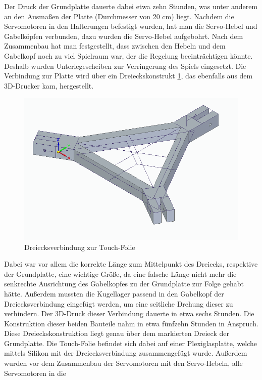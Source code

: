 \documentclass[12pt,a4paper,bibliography=totoc,listof=totoc]{scrartcl}
\begin{document}
Der Druck der Grundplatte dauerte dabei etwa zehn Stunden, was unter anderem an den Ausmaßen der Platte 
(Durchmesser von 20 cm) liegt. Nachdem die Servomotoren in den Halterungen befestigt wurden, hat man die 
Servo-Hebel und Gabelköpfen verbunden, dazu wurden die Servo-Hebel aufgebohrt. Nach dem Zusammenbau hat man 
festgestellt, dass zwischen den Hebeln und dem Gabelkopf noch zu viel Spielraum war, der die Regelung 
beeinträchtigen könnte. Deshalb wurden Unterlegescheiben zur Verringerung des Spiels eingesetzt. Die 
Verbindung zur Platte wird über ein Dreieckskonstrukt \ref{fig:Dreiecksverbindung}, das ebenfalls aus dem 
3D-Drucker kam, hergestellt. 
\begin{figure}[htbp]
	\centering
	\includegraphics[scale = 0.45]{pics/BildDreieck}
	\caption{Dreiecksverbindung zur Touch-Folie}
	\label{fig:Dreiecksverbindung}
\end{figure}
Dabei war vor allem die korrekte Länge zum Mittelpunkt des Dreiecks, 
respektive der Grundplatte, eine wichtige Größe, da eine falsche Länge nicht mehr die senkrechte 
Ausrichtung des Gabelkopfes zu der Grundplatte zur Folge gehabt hätte. Außerdem mussten die Kugellager 
passend in den Gabelkopf der Dreiecksverbindung eingefügt werden, um eine seitliche Drehung dieser zu 
verhindern.
Der 3D-Druck dieser Verbindung dauerte in etwa sechs Stunden. Die Konstruktion dieser beiden Bauteile 
nahm in etwa fünfzehn Stunden in Anspruch. Diese Dreieckskonstruktion liegt genau über dem markierten 
Dreieck der Grundplatte. Die Touch-Folie befindet sich dabei auf einer Plexiglasplatte, welche mittels 
Silikon mit der Dreiecksverbindung zusammengefügt wurde.
Außerdem wurden vor dem Zusammenbau der Servomotoren mit den Servo-Hebeln, alle Servomotoren in die 
\end{document}
